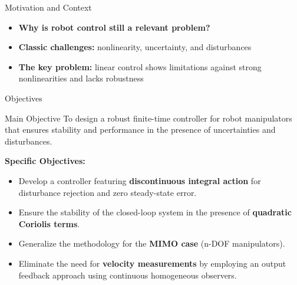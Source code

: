  \begin{frame}
    \sectionpage
\end{frame}

\begin{frame}{Motivation and Context}
    \begin{itemize}
        \item \textbf{Why is robot control still a relevant problem?}
        \item \textbf{Classic challenges:} nonlinearity, uncertainty, and disturbances
        \item \textbf{The key problem:} linear control shows limitations against strong nonlinearities and lacks robustness
    \end{itemize}
\end{frame}

\begin{frame}{Objectives}
    \begin{block}{Main Objective}
        To design a robust finite-time controller for robot manipulators that ensures stability and performance in the presence of uncertainties and disturbances.
    \end{block}
    
    \textbf{Specific Objectives:}
    \begin{itemize}
        \item Develop a controller featuring \textbf{discontinuous integral action} for disturbance rejection and zero steady-state error.
        \item Ensure the stability of the closed-loop system in the presence of \textbf{quadratic Coriolis terms}.
        \item Generalize the methodology for the \textbf{MIMO case} (n-DOF manipulators).
        \item Eliminate the need for \textbf{velocity measurements} by employing an output feedback approach using continuous homogeneous observers.
    \end{itemize}
\end{frame}
